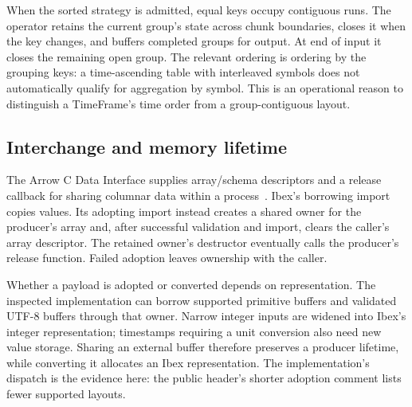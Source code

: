 When the sorted strategy is admitted, equal keys occupy contiguous runs.
The operator retains the current group's state across chunk boundaries,
closes it when the key changes, and buffers completed groups for output.
At end of input it closes the remaining open group. The relevant ordering
is ordering by the grouping keys: a time-ascending table with interleaved
symbols does not automatically qualify for aggregation by symbol. This is
an operational reason to distinguish a TimeFrame's time order from a
group-contiguous layout.


\subsection{Interchange and memory lifetime}
The Arrow C Data Interface supplies array/schema descriptors and a release
callback for sharing columnar data within a process~\cite{arrowCData}.
Ibex's borrowing import copies values. Its adopting import instead creates a
shared owner for the producer's array and, after successful validation and
import, clears the caller's array descriptor. The retained owner's destructor
eventually calls the producer's release function. Failed adoption leaves
ownership with the caller.

Whether a payload is adopted or converted depends on representation. The
inspected implementation can borrow supported primitive buffers and validated
UTF-8 buffers through that owner. Narrow integer inputs are widened into
Ibex's integer representation; timestamps requiring a unit conversion also
need new value storage. Sharing an external buffer therefore preserves a
producer lifetime, while converting it allocates an Ibex representation.
The implementation's  dispatch is the evidence here:
the public header's shorter adoption comment lists fewer supported layouts.


